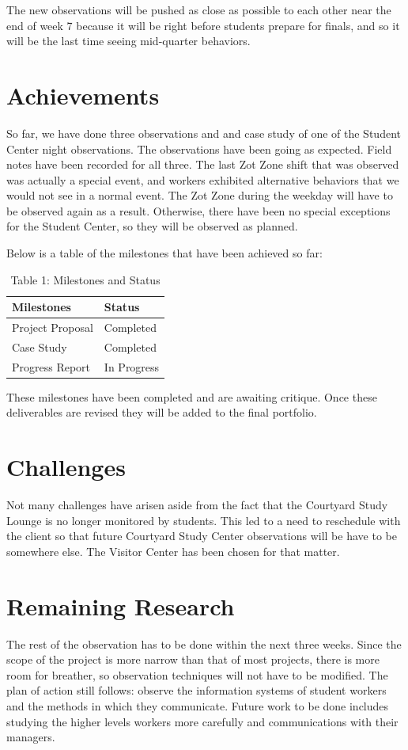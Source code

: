 \documentclass[letterpaper, 12pt]{report}
\begin{document}
	The new observations will be pushed as close as possible to each other near the end of week 7 because it will be right before students prepare for finals, and so it will be the last time seeing mid-quarter behaviors.
	
	\section{Achievements}
	So far, we have done three observations and and case study of one of the Student Center night observations. The observations have been going as expected. Field notes have been recorded for all three. The last Zot Zone shift that was observed was actually a special event, and workers exhibited alternative behaviors that we would not see in a normal event. The Zot Zone during the weekday will have to be observed again as a result. Otherwise, there have been no special exceptions for the Student Center, so they will be observed as planned.
	
	Below is a table of the milestones that have been achieved so far:
	\begin{table}[ht]
		\centering
		\caption*{Table 1: Milestones and Status}
		\begin{tabular}{l l}
			\hline\hline
			Milestones & Status\\
			\hline
			Project Proposal&Completed \\
			Case Study&Completed \\
			Progress Report&In Progress\\
			\hline
		\end{tabular}
		
	\end{table}
	
	These milestones have been completed and are awaiting critique. Once these deliverables are revised they will be added to the final portfolio.
	
	\section{Challenges}
	Not many challenges have arisen aside from the fact that the Courtyard Study Lounge is no longer monitored by students. This led to a need to reschedule with the client so that future Courtyard Study Center observations will be have to be somewhere else. The Visitor Center has been chosen for that matter.
	\section{Remaining Research}
	The rest of the observation has to be done within the next three weeks. Since the scope of the project is more narrow than that of most projects, there is more room for breather, so observation techniques will not have to be modified. The plan of action still follows: observe the information systems of student workers and the methods in which they communicate. Future work to be done includes studying the higher levels workers more carefully and communications with their managers.
	
\end{document}
